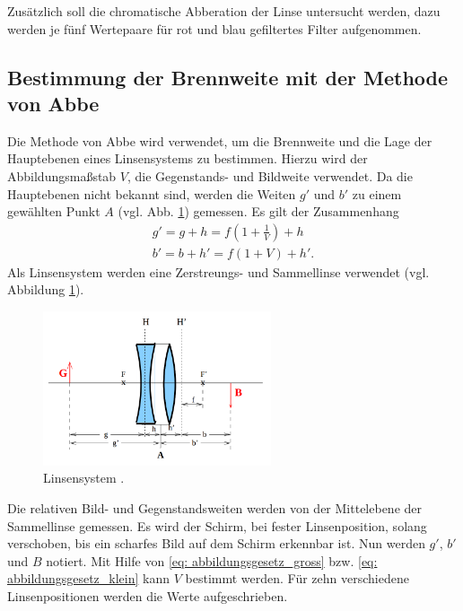 Zusätzlich soll die chromatische Abberation der Linse untersucht werden,
dazu werden je fünf Wertepaare für rot und blau gefiltertes Filter
aufgenommen.
\subsection{Bestimmung der Brennweite mit der Methode von Abbe}
Die Methode von Abbe wird verwendet, um die Brennweite und die Lage der Hauptebenen
eines Linsensystems zu bestimmen. Hierzu wird der Abbildungsmaßstab $V$,
die Gegenstands- und Bildweite verwendet. Da die Hauptebenen nicht bekannt sind,
werden die Weiten $g'$ und $b'$ zu einem gewählten Punkt $A$ (vgl. Abb. \ref{fig: linsensystem}) gemessen.
Es gilt der Zusammenhang
\begin{align}
    g'=g+h=f\left(1+\frac{1}{V}\right)+h \label{eq: abstaende_abbe_g} \\
    b'=b+h'=f\left(1+V\right)+h' \label{eq: abstaende_abbe_b}.
\end{align}
Als Linsensystem werden eine Zerstreungs- und Sammellinse verwendet (vgl. Abbildung \ref{fig: linsensystem}). %
\begin{figure}
    \centering
    \includegraphics[width=0.6\textwidth]{./pics/linsensystem.png}
    \caption{Linsensystem \cite{anleitung408}.}
    \label{fig: linsensystem}
\end{figure}
Die relativen Bild- und Gegenstandsweiten werden von der Mittelebene
der Sammellinse gemessen.
Es wird der Schirm, bei fester Linsenposition, solang verschoben, bis ein scharfes
Bild auf dem Schirm erkennbar ist. Nun werden $g'$, $b'$ und $B$ notiert.
Mit Hilfe von \eqref{eq: abbildungsgesetz_gross} bzw. \eqref{eq: abbildungsgesetz_klein}
kann $V$ bestimmt werden.
Für zehn verschiedene Linsenpositionen werden die Werte aufgeschrieben. %
